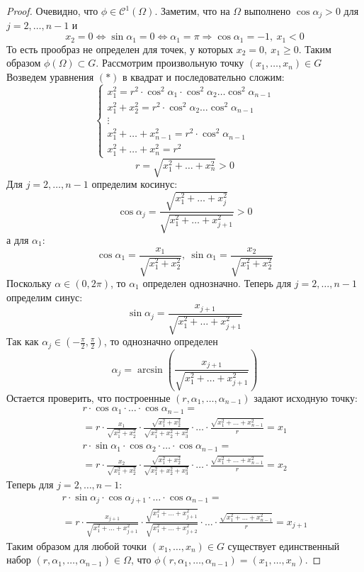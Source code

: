 \begin{proof}
    Очевидно, что $\phi\in \mathcal{C}^1(\Omega)$. Заметим, что на $\Omega$ выполнено $\cos{\alpha_j}>0$ для $j=2,\dots,n-1$ и 
    \[x_2=0 \Leftrightarrow \sin{\alpha_1}=0 \Leftrightarrow \alpha_1=\pi \Rightarrow \cos{\alpha_1}=-1,\ x_1<0\]
    То есть прообраз не определен для точек, у которых $x_2=0,\ x_1\geq 0$.
    Таким образом $\phi(\Omega)\subset G$. Рассмотрим произвольную точку $(x_1,\dots,x_n)\in G$ Возведем уравнения $(*)$ в квадрат и последовательно сложим:
    \[\begin{cases}
    x_1^2=r^2\cdot \cos^2{\alpha_1}\cdot \cos^2{\alpha_2}\dots\cos^2{\alpha_{n-1}}\\
    x_1^2+x_2^2=r^2\cdot \cos^2{\alpha_2}\dots\cos^2{\alpha_{n-1}}\\
    \vdots\\
    x_1^2+\dots+x_{n-1}^2=r^2\cdot \cos^2{\alpha_{n-1}}\\
    x_1^2+\dots+x_n^2=r^2
    \end{cases}\]
    \[r=\sqrt{x_1^2+\dots+x_n^2}>0\]
    Для $j=2,\dots,n-1$ определим косинус:
    \[\cos{\alpha_j}=\frac{\sqrt{x_1^2+\dots+x_j^2}}{\sqrt{x_1^2+\dots+x_{j+1}^2}}>0\]
    а для $\alpha_1$:
    \[\cos{\alpha_1}=\frac{x_1}{\sqrt{x_1^2+x_2^2}},\ \sin{\alpha_1}=\frac{x_2}{\sqrt{x_1^2+x_2^2}}\]
    Поскольку $\alpha\in(0,2\pi)$, то $\alpha_1$ определен однозначно. Теперь для $j=2,\dots,n-1$ определим синус:
    \[\sin{\alpha_j}=\frac{x_{j+1}}{\sqrt{x_1^2+\dots+x_{j+1}^2}}\]
    Так как $\alpha_j\in \left(-\frac{\pi}{2}, \frac{\pi}{2}\right)$, то однозначно определен
    \[\alpha_j=\arcsin\left(\frac{x_{j+1}}{\sqrt{x_1^2+\dots+x_{j+1}^2}}\right)\]
    Остается проверить, что построенные $(r,\alpha_1,\dots,\alpha_{n-1})$ задают исходную точку:
    \begin{multline*}
        r\cdot\cos{\alpha_1}\cdot \dots\cdot \cos{\alpha_{n-1}}=\\
        =r\cdot \frac{x_1}{\sqrt{x_1^2+x_2^2}}\cdot \frac{\sqrt{x_1^2+x_2^2}}{\sqrt{x_1^2+x_2^2+x_3^2}}\cdot \dots \cdot \frac{\sqrt{x_1^2+\dots+x_{n-1}^2}}{r}=x_1
    \end{multline*}
    \begin{multline*}
        r\cdot\sin{\alpha_1}\cdot \cos{\alpha_2}\cdot \dots\cdot \cos{\alpha_{n-1}}=\\
        =r\cdot\frac{x_2}{\sqrt{x_1^2+x_2^2}}\cdot \frac{\sqrt{x_1^2+x_2^2}}{\sqrt{x_1^2+x_2^2+x_3^2}}\cdot \dots \cdot \frac{\sqrt{x_1^2+\dots+x_{n-1}^2}}{r}=x_2
    \end{multline*}
    Теперь для $j=2,\dots,n-1$:
    \begin{multline*}
        r\cdot \sin{\alpha_j}\cdot \cos{\alpha_{j+1}\cdot \dots \cdot \cos{\alpha_{n-1}}}=\\
        =r\cdot \frac{x_{j+1}}{\sqrt{x_1^2+\dots+x_{j+1}^2}}\cdot \frac{\sqrt{x_1^2+\dots+x_{j+1}^2}}{\sqrt{x_1^2+\dots+x_{j+2}^2}}\cdot \dots \cdot \frac{\sqrt{x_1^2+\dots+x_{n-1}^2}}{r}=x_{j+1}
    \end{multline*}
    Таким образом для любой точки $(x_1,\dots,x_n)\in G$ существует единственный набор $(r,\alpha_1,\dots,\alpha_{n-1})\in \Omega$, что $\phi(r,\alpha_1,\dots,\alpha_{n-1})=(x_1,\dots,x_n)$.
\end{proof}
